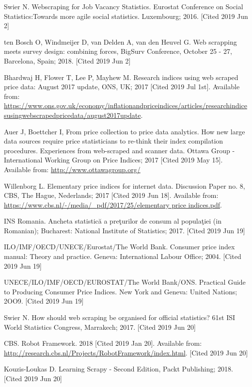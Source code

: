 \documentclass[]{article}
\begin{document}
\begin{thebibliography}{99}
Swier N. Webscraping for Job Vacancy Statistics. Eurostat Conference on Social Statistics:Towards more agile social statistics. Luxembourg; 2016. [Cited 2019 Jun 2]

ten Bosch O, Windmeijer D, van Delden A, van den Heuvel G. Web scrapping meets survey design: combining forces,
BigSurv Conference, October 25 - 27, Barcelona, Spain; 2018. [Cited 2019 Jun 2]

Bhardwaj H, Flower T, Lee P, Mayhew M. Research indices using web scraped price data: August 2017 update, ONS, UK; 2017 [Cited 2019 Jul 1st]. Available from:
\url{https://www.ons.gov.uk/economy/inflationandpriceindices/articles/researchindicesusingwebscrapedpricedata/august2017update}.

Auer J, Boettcher I, From price collection to price data analytics. How new large data sources require price statisticians to re-think their index compilation procedures. Experiences from web-scraped and scanner data.
Ottawa Group - International Working Group on Price Indices; 2017 [Cited 2019 May 15]. Available from: \url{http://www.ottawagroup.org/}

Willenborg L. Elementary price indices for internet data. Discussion Paper no. 8, CBS, The Hague, Nederlands; 2017 [Cited 2019 Jun 18]. Available from:
\url{https://www.cbs.nl/-/media/_pdf/2017/25/elementary price indices.pdf}.

INS Romania. Ancheta statistică a preţurilor de consum al populaţiei (in Romanian); Bucharest: National Institute of Statistics; 2017. [Cited 2019 Jun 19]

ILO/IMF/OECD/UNECE/Eurostat/The World Bank. Consumer price index manual: Theory and practice. Geneva: International Labour Office; 2004. [Cited 2019 Jun 19]

UNECE/ILO/IMF/OECD/EUROSTAT/The World Bank/ONS. Practical Guide to Producing Consumer Price Indices. New York and Geneva: United Nations; 2OO9. [Cited 2019 Jun 19]

Swier N. How should web scraping be organised for official statistics? 61st ISI World Statistics Congress, Marrakech; 2017. [Cited 2019 Jun 20]

CBS. Robot Framework. 2018 [Cited 2019 Jan 20]. Available from: \url{http://research.cbs.nl/Projects/RobotFramework/index.html}. [Cited 2019 Jun 20]

Kouzis-Loukas D. Learning Scrapy - Second Edition, Packt Publishing; 2018. [Cited 2019 Jun 20]


\end{thebibliography}
\end{document}
